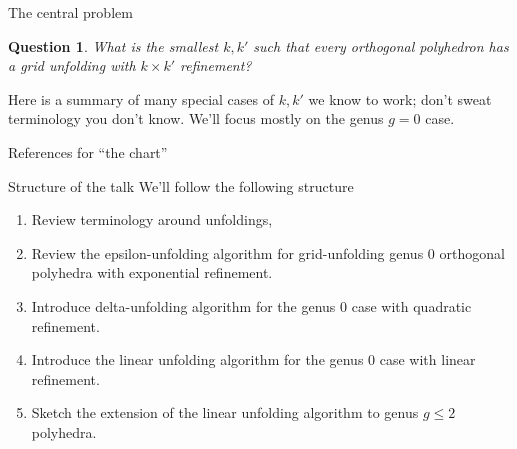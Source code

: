 \documentclass{beamer}
\theoremstyle{plain}
\newtheorem{question}{Question}
\begin{document}
  \begin{frame}{The central problem}
    \begin{question}
      What is the smallest $k,k'$ such that every orthogonal polyhedron has a grid unfolding with $k \times k'$ refinement?
    \end{question}
    \pause Here is a summary of many special cases of $k,k'$ we know to work;
    don't sweat terminology you don't know.
      \pause We'll focus mostly on the genus $g = 0$ case.
  \end{frame}

  \begin{frame}{References for ``the chart''}
    \printbibliography
  \end{frame}

  \begin{frame}{Structure of the talk}
    We'll follow the following structure
    \begin{enumerate}
      \item Review terminology around unfoldings,
      \pause \item Review the epsilon-unfolding algorithm for grid-unfolding genus 0 orthogonal polyhedra with exponential refinement.
      \pause \item Introduce delta-unfolding algorithm for the genus $0$ case with quadratic refinement. 
      \pause \item Introduce the linear unfolding algorithm for the genus 0 case with linear refinement.
      \pause \item Sketch the extension of the linear unfolding algorithm to genus $g \leq 2$ polyhedra.
    \end{enumerate}
  \end{frame}
\end{document}
